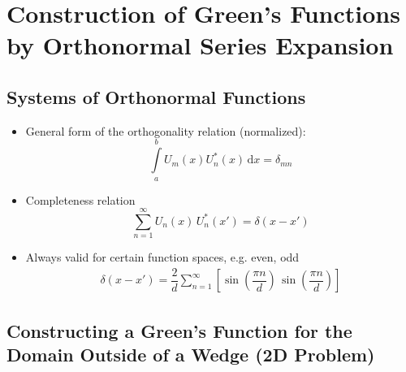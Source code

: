 \section{Construction of Green's Functions by Orthonormal Series Expansion}
\subsection{Systems of Orthonormal Functions}
\begin{itemize}
        \item General form of the orthogonality relation (normalized):
\begin{equation*}
  \int\limits_{a}^{b}U_{m}(x)U_{n}^{*}(x)\,\mathrm{d}x = \delta_{mn}
\end{equation*}
  \item Completeness relation
        \begin{equation*}
          \sum\limits_{n=1}^{\infty} U_{n}(x)\,U^{*}_{n}(x') = \delta(x - x')
        \end{equation*}
  \item Always valid for certain function spaces, e.g. even, odd
        \begin{align*}
          \delta(x - x') = \dfrac{2}{d} \sum\limits_{n=1}^{\infty}
          \left[
          \sin\left(\dfrac{\pi n}{d}\right)
          \,
          \sin\left(\dfrac{\pi n}{d}\right)
          \right]
        \end{align*}
\end{itemize}
\subsection{Constructing a Green's Function for the Domain Outside of a Wedge (2D Problem)}
